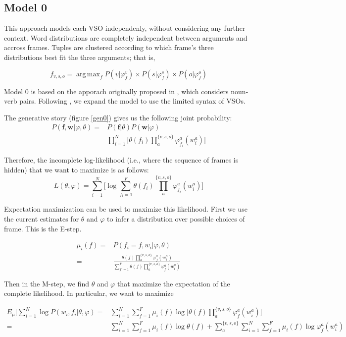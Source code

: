\documentclass{article} %
\renewcommand\phi\varphi
\DeclareMathOperator*{\argmax}{arg\,max}
\begin{document}
\subsection{Model 0}

This approach models each VSO independenly, without considering any further context.
Word distributions are completely independent between arguments and accross frames.
Tuples are clustered according to which frame's three distributions best fit the 
three arguments; that is,

\[
f_{v,s,o} = \argmax_f P(v|\phi_f^v) \times P(s|\phi_f^s) \times P(o|\phi_f^o)
\]

Model 0 is based on the apporach originally proposed in \citet{rooth1999}, which 
considers noun-verb pairs. Following \citet{oconnor2013}, we expand the model
to use the limited syntax of VSOs.

The generative story (figure \ref{gen0}) gives us the following joint probability:
\begin{align*}
P(\mathbf{f},\mathbf{w}|\phi,\theta) 
  =& P(\mathbf{f}|\theta)P(\mathbf{w}|\phi)\\
  =& \prod_{i=1}^{N}\big[\theta(f_i) \prod_a^{\{v,s,o\}}\phi_{f_i}^a(w_i^a)\big]
\end{align*}

Therefore, the incomplete log-likelihood (i.e., where the sequence of frames
is hidden) that we want to maximize is as follows:
\[
L(\theta,\phi) = \sum_{i=1}^N\big[\log \sum_{f_i=1}^F\theta(f_i)\prod_{a}^{\{v,s,o\}}\phi_{f_i}^a(w^a_i)\big]
\]

Expectation maximization can be used to maximize this likelihood.
First we use the current estimates for $\theta$ and $\phi$ to infer a 
distribution over possible choices of frame. This is the E-step. 

\begin{align}
\mu_i(f) =& P(f_i=f, w_i|\phi,\theta)\nonumber\\
=& \frac{\theta(f)\prod_a^{\{v,s,o\}}\phi_f^a(w^a_i)}
                {\sum_{f'=1}^F\theta(f)\prod_a^{\{v,s,o\}}\phi_f^a(w^a_i)}\label{E}
\end{align}

Then in the M-step, we find $\theta$ and $\phi$ that maximize the expectation of
the complete likelihood. In particular, we want to maximize

\begin{align*}
E_\mu\big[\sum_{i=1}^N\log P(w_i,f_i|\theta,\phi)
=& \sum_{i=1}^N\sum_{f=1}^F\mu_i(f)\log\Big[\theta(f)\prod_a^{\{v,s,o\}}\phi_f^a(w_i^a)\Big]\\
=& \sum_{i=1}^N\sum_{f=1}^F\mu_i(f)\log\theta(f)
+ \sum_a^{\{v,s,o\}} \sum_{i=1}^N\sum_{f=1}^F\mu_i(f)\log \phi_f^a(w_i^a)
\end{align*}
\end{document}
